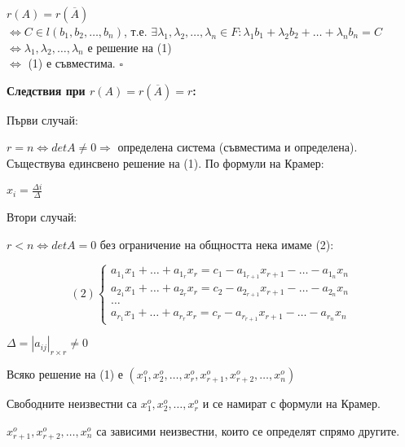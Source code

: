 \documentclass[fleqn,12pt]{article}
\begin{document}
\begin{flushleft}
    \vspace{5mm}

    $ r(A) = r(\overline{A})$ \\
    $\Leftrightarrow C \in l(b_1, b_2, \dots, b_n)$, т.е. $\exists \lambda_1, \lambda_2, \dots, \lambda_n \in F: \lambda_1 b_1 + \lambda_2 b_2 + \dots + \lambda_n b_n = C$ \\
    $\Leftrightarrow \lambda_1, \lambda_2, \dots, \lambda_n$ е решение на (1) \\
    $\Leftrightarrow$ (1) е съвместима. $\square$

    \vspace{5mm}
    \textbf{Следствия при $r(A) = r(\overline{A}) = r$:}


    Първи случай: 

    $ r = n \Leftrightarrow detA \neq 0 \Rightarrow $ определена система (съвместима и определена). Съществува единсвено решение на (1). По формули на Крамер:

    $ x_i = \frac{\Delta i}{\Delta} $

    \vspace{5mm}

    Втори случай:

    $ r < n \Leftrightarrow detA = 0 $ без ограничение на общността нека имаме (2):

    \begin{equation*}
        (2)\begin{cases}
            a_{1_1}x_1+\dots+a_{1_r}x_r = c_1 - a_{1_{r+1}}x_{r+1} - \dots - a_{1_n}x_n\\
            a_{2_1}x_1+\dots+a_{2_r}x_r = c_2 - a_{2_{r+1}}x_{r+1} - \dots - a_{2_n}x_n\\
            \dots\\
            a_{r_1}x_1+\dots+a_{r_r}x_r = c_r - a_{r_{r+1}}x_{r+1} - \dots - a_{r_n}x_n
        \end{cases}
    \end{equation*}

    $ \Delta = | a_{ij} |_{r \times r} \neq 0 $

    Всяко решение на (1) е $ ( x_1^o, x_2^o, \dots, x_r^o, x_{r+1}^o, x_{r+2}^o, \dots, x_n^o ) $

    Свободните неизвестни са $ x_1^o, x_2^o, \dots, x_r^o $ и се намират с формули на Крамер.

    $x_{r+1}^o, x_{r+2}^o, \dots, x_n^o $ са зависими неизвестни, които се определят спрямо другите.



\end{flushleft}
\end{document}

